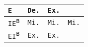 \begin{tabular}{|l||c|c|c|}
 \texttt{E}

 & \cellcolor{blue!40}\texttt{De.}
 & \cellcolor{orange!60}\texttt{Ex.}
 & \cellcolor{black!40}
 \\
 \hline

 \texttt{IE\textsuperscript{B}}

 & \cellcolor{olive!80}\texttt{Mi.}
 & \cellcolor{olive!80}\texttt{Mi.}
 & \cellcolor{olive!80}\texttt{Mi.}
 \\
 \hline

 \texttt{EI\textsuperscript{B}}
 & \cellcolor{orange!60}\texttt{Ex.}
 & \cellcolor{orange!60}\texttt{Ex.}
 & \cellcolor{black!40}
 \\
 \hline

\end{tabular}%
